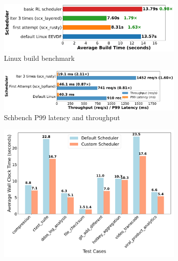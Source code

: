 \documentclass[preprint]{article}
\begin{document}
\begin{figure}[h]
\centering
\begin{minipage}{0.48\textwidth}
    \begin{subfigure}[b]{\textwidth}
        \centering
        \includegraphics[width=\textwidth]{sections/Linux_build_benchmark_results.pdf}
        \caption{Linux build benchmark}
        \label{fig:performance-comparison}
    \end{subfigure}
    \vspace{0.3cm}
    \begin{subfigure}[b]{\textwidth}
        \centering
        \includegraphics[width=\textwidth]{sections/schbench_performance_comparison.pdf}
        \caption{Schbench P99 latency and throughput}
        \label{fig:schbench-comparison}
    \end{subfigure}
\end{minipage}
\hfill
\begin{minipage}{0.48\textwidth}
    \begin{subfigure}[b]{\textwidth}
        \centering
        \includegraphics[width=\textwidth]{sections/scheduler_performance_comparison.pdf}

\end{subfigure}
\end{minipage}
\end{figure}
\end{document}
